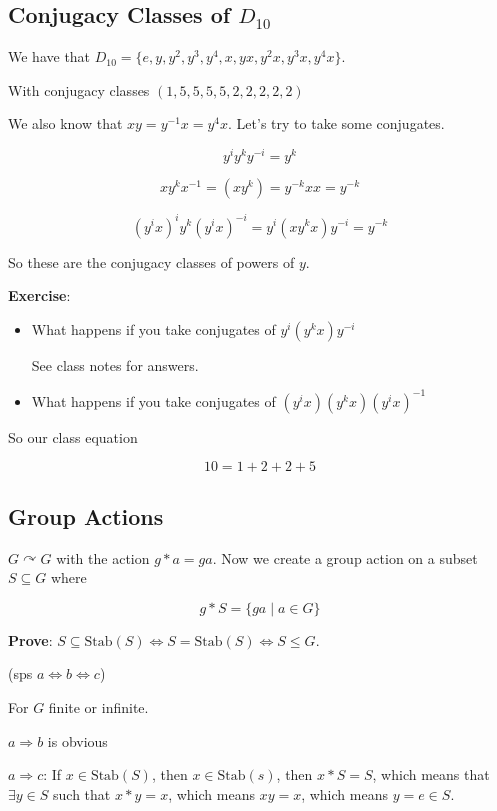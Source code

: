 \documentclass[12pt]{article}
\def\Stab{\text{Stab}}
\def\acts{\curvearrowright} %
\theoremstyle{remark}
\theoremstyle{remark}
\theoremstyle{remark}
\theoremstyle{remark}
\theoremstyle{remark}
\begin{document}
\subsection{Conjugacy Classes of $D_{10}$}

We have that $D_{10} = \{e, y, y^2, y^3, y^4, x, yx, y^2x, y^3x, y^4x \}$.

With conjugacy classes $(1, 5, 5, 5, 5, 2, 2, 2, 2, 2)$

We also know that $xy = y^{-1}x = y^4x$. Let's try to take some conjugates.

\[
  y^i y^k y^{-i} = y^k
\]

\[
  xy^kx^{-1} = (xy^k) = y^{-k}xx = y^{-k}
\]

\[
  (y^ix)^i y^k (y^ix)^{-i} = y^i (xy^kx) y^{-i} = y^{-k}
\]

So these are the conjugacy classes of powers of $y$.

{\bf Exercise}:
\begin{itemize}
  \item What happens if you take conjugates of $y^i (y^k x) y^{-i}$

    See class notes for answers.

  \item What happens if you take conjugates of $(y^i x) (y^k x) (y^i x)^{-1}$
\end{itemize}

So our class equation

\[
  10 = 1 + 2 + 2 + 5
\]

\subsection{Group Actions}

$G \acts G$ with the action $g * a = ga$. Now we create a group action on a
subset $S \subseteq G$ where

\[
  g * S = \{ ga \mid a \in G \}
\]

{\bf Prove}: $S \subseteq \Stab(S) \Leftrightarrow S = \Stab(S) \Leftrightarrow S \le G$.

(sps $a \Leftrightarrow b \Leftrightarrow c$)

For $G$ finite or infinite.

$a \Rightarrow b$ is obvious

$a \Rightarrow c$: If $x \in \Stab(S)$, then $x
\in \Stab(s)$, then $x * S = S$, which means that $\exists y \in S$ such that $x
* y = x$, which means $xy = x$, which means $y = e \in S$.
\end{document}
